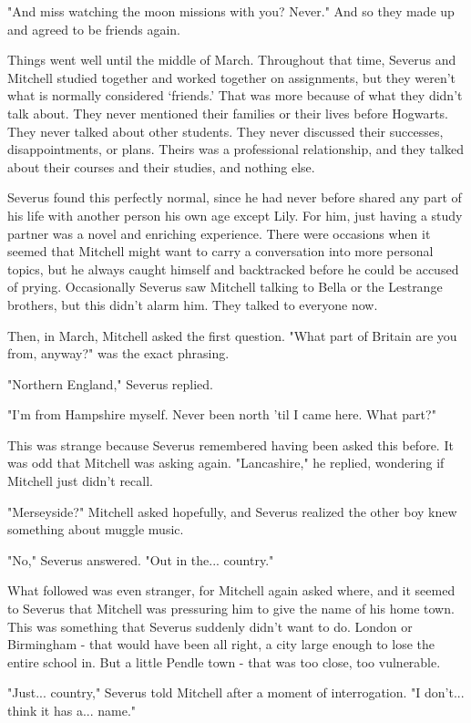 \documentclass[a4paper,11pt]{article}
\begin{document}
"And miss watching the moon missions with you? Never." And so they made up and agreed to be friends again.

Things went well until the middle of March. Throughout that time, Severus and Mitchell studied together and worked together on assignments, but they weren't what is normally considered `friends.' That was more because of what they didn't talk about. They never mentioned their families or their lives before Hogwarts. They never talked about other students. They never discussed their successes, disappointments, or plans. Theirs was a professional relationship, and they talked about their courses and their studies, and nothing else.

Severus found this perfectly normal, since he had never before shared any part of his life with another person his own age except Lily. For him, just having a study partner was a novel and enriching experience. There were occasions when it seemed that Mitchell might want to carry a conversation into more personal topics, but he always caught himself and backtracked before he could be accused of prying. Occasionally Severus saw Mitchell talking to Bella or the Lestrange brothers, but this didn't alarm him. They talked to everyone now.

Then, in March, Mitchell asked the first question. "What part of Britain are you from, anyway?" was the exact phrasing.

"Northern England," Severus replied.

"I'm from Hampshire myself. Never been north 'til I came here. What part?"

This was strange because Severus remembered having been asked this before. It was odd that Mitchell was asking again. "Lancashire," he replied, wondering if Mitchell just didn't recall.

"Merseyside?" Mitchell asked hopefully, and Severus realized the other boy knew something about muggle music.

"No," Severus answered. "Out in the... country."

What followed was even stranger, for Mitchell again asked where, and it seemed to Severus that Mitchell was pressuring him to give the name of his home town. This was something that Severus suddenly didn't want to do. London or Birmingham - that would have been all right, a city large enough to lose the entire school in. But a little Pendle town - that was too close, too vulnerable.

"Just... country," Severus told Mitchell after a moment of interrogation. "I don't... think it has a... name."
\end{document}
